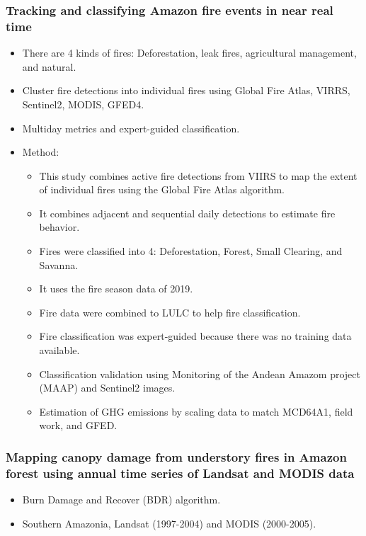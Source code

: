 \documentclass{beamer}
\begin{document}
\begin{frame}[t, allowframebreaks]
    \frametitle{Tracking and classifying Amazon fire events in near real time
    ~\cite{andela2022}}
    \begin{itemize}
        \item There are 4 kinds of fires: Deforestation, leak fires, 
            agricultural management, and natural.
        \item Cluster fire detections into individual fires using Global Fire
            Atlas, VIRRS, Sentinel2, MODIS, GFED4.
        \item Multiday metrics and expert-guided classification.
        \item Method:
            \begin{itemize}
            \item This study combines active fire detections from VIIRS to map 
                the extent of individual fires using the Global Fire Atlas 
                    algorithm.
            \item It combines adjacent and sequential daily detections to 
                estimate fire behavior.
            \item Fires were classified into 4: Deforestation, Forest, Small 
                Clearing, and Savanna.
            \item It uses the fire season data of 2019.
            \item Fire data were combined to LULC to help fire classification.
            \item Fire classification was expert-guided because there was no 
                training data available.
            \item Classification validation using Monitoring of the Andean 
                Amazom project (MAAP) and Sentinel2 images.
            \item Estimation of GHG emissions by scaling data to match MCD64A1, 
                field work, and GFED.
        \end{itemize}
    \end{itemize}
\end{frame}



\begin{frame}[t, allowframebreaks]
    \frametitle{Mapping canopy damage from understory fires in Amazon forest
    using annual time series of Landsat and MODIS data}
    \begin{itemize}
        \item Burn Damage and Recover (BDR) algorithm.
        \item Southern Amazonia, Landsat (1997-2004) and MODIS (2000-2005).
    \end{itemize}
\end{frame}
\end{document}
